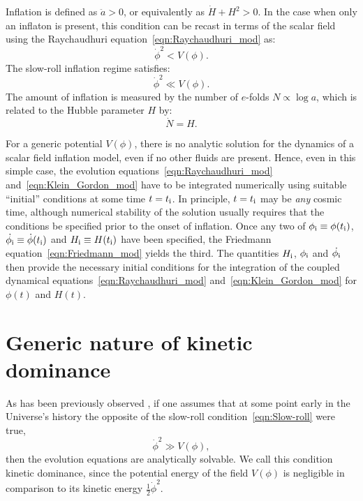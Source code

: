 Inflation is defined as $\ddot{a}>0$, or equivalently as $\dot{H}+H^2>0$. In the case when only an inflaton is present, this condition can be recast in terms of the scalar field using the Raychaudhuri equation~\eqref{eqn:Raychaudhuri_mod} as:
%
\begin{equation}
  \dot{\phi}^2<V(\phi).
  \label{eqn:Onset_inflation}
\end{equation}
%
The slow-roll inflation regime satisfies:
%
\begin{equation}
  \dot{\phi}^2\ll V(\phi).
  \label{eqn:Slow-roll}
\end{equation}
%
The amount of inflation is measured by the number of $e$-folds $N\propto \log a$, which is related to the Hubble parameter $H$ by:
%
\begin{equation}
  \dot{N}=H.\label{eqn:e-folds}
\end{equation}
%

For a generic potential $V(\phi)$, there is no analytic solution for the dynamics of a scalar field inflation model, even if no other fluids are present. Hence, even in this simple case, the evolution equations~\eqref{eqn:Raychaudhuri_mod} and~\eqref{eqn:Klein_Gordon_mod} have to be integrated numerically using suitable ``initial'' conditions at some time $t=t_{\mathrm{i}}$. In principle, $t=t_{\mathrm{i}}$ may be {\em any\/} cosmic time, although numerical stability of the solution usually requires that the conditions be specified prior to the onset of inflation.  Once any two of $\phi_{\mathrm{i}} \equiv \phi(t_{\mathrm{i}})$, $\dot{\phi_{\mathrm{i}}} \equiv \dot{\phi}(t_{\mathrm{i}})$ and $H_{\mathrm{i}} \equiv H(t_{\mathrm{i}})$ have been specified, the Friedmann equation~\eqref{eqn:Friedmann_mod} yields the third. The quantities $H_{\mathrm{i}}$, $\phi_{\mathrm{i}}$ and $\dot{\phi_{\mathrm{i}}}$ then provide the necessary initial conditions for the integration of the coupled dynamical equations~\eqref{eqn:Raychaudhuri_mod} and~\eqref{eqn:Klein_Gordon_mod} for $\phi(t)$ and $H(t)$.
\section{Generic nature of kinetic dominance}
\label{sec:The_generic_nature_of_kinetic_dominance}

As has been previously observed \citep{Linde_initial_conditions_1985, belinsky_inflationary_1985,particle_astrophysics_1990}, if one assumes that at some point early in the Universe's history the opposite of the slow-roll condition~\eqref{eqn:Slow-roll} were true,
%
\begin{equation}
  \dot\phi^2\gg V(\phi),
  \label{eqn:kddef}
\end{equation}
%
then the evolution equations are analytically solvable.  We call this condition kinetic dominance, since the potential energy of the field $V(\phi)$ is negligible in comparison to its kinetic energy $\frac{1}{2}\dot\phi^2$.


